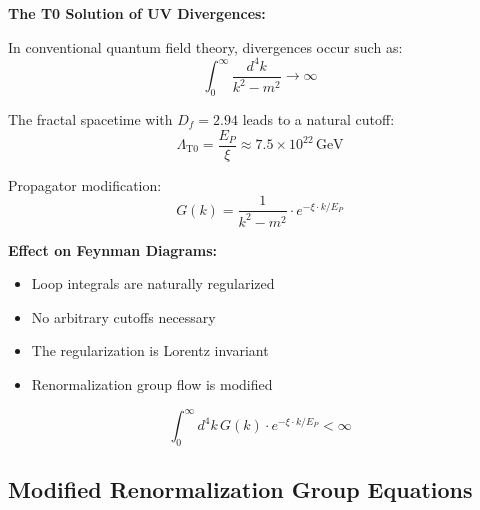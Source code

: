 \documentclass[12pt,a4paper]{article}
\newcommand{\xipar}{\xi}
\begin{document}
	\begin{application}
		\textbf{The T0 Solution of UV Divergences:}
		
		In conventional quantum field theory, divergences occur such as:
		\begin{equation}
			\int_0^\infty \frac{d^4k}{k^2 - m^2} \to \infty
		\end{equation}
		
		The fractal spacetime with $D_f = 2.94$ leads to a natural cutoff:
		\begin{equation}
			\boxed{\Lambda_{\text{T0}} = \frac{E_P}{\xipar} \approx 7.5 \times 10^{22}\, \text{GeV}}
		\end{equation}
		
		Propagator modification:
		\begin{equation}
			G(k) = \frac{1}{k^2 - m^2} \cdot e^{-\xipar \cdot k/E_P}
		\end{equation}
		
		\textbf{Effect on Feynman Diagrams:}
		\begin{itemize}
			\item Loop integrals are naturally regularized
			\item No arbitrary cutoffs necessary
			\item The regularization is Lorentz invariant
			\item Renormalization group flow is modified
		\end{itemize}
		
		\begin{equation}
			\int_0^\infty d^4k\, G(k) \cdot e^{-\xipar \cdot k/E_P} < \infty
		\end{equation}
	\end{application}
	
	\subsection{Modified Renormalization Group Equations}
	
\end{document}
